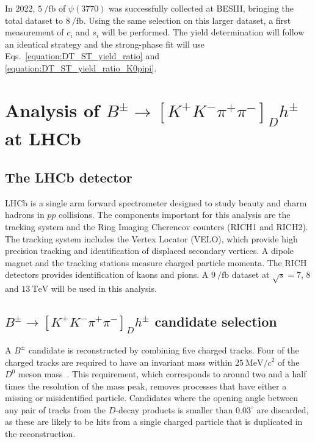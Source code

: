 \documentclass[12pt, a4paper, notitlepage, onecolumn]{article}
\begin{document}
In 2022, $\SI{5}{\per\femto\barn}$ of $\psi(3770)$ was successfully collected at BESIII, bringing the total dataset to $\SI{8}{\per\femto\barn}$. Using the same selection on this larger dataset, a first measurement of $c_i$ and $s_i$ will be performed. The yield determination will follow an identical strategy and the strong-phase fit will use Eqs.~\eqref{equation:DT_ST_yield_ratio} and \eqref{equation:DT_ST_yield_ratio_K0pipi}.

\section{Analysis of \texorpdfstring{$B^\pm\to[K^+K^-\pi^+\pi^-]_Dh^\pm$}{B2DhD2KKpipi} at LHCb}
\subsection{The LHCb detector}
\noindent LHCb \cite{cite_LHCb} is a single arm forward spectrometer designed to study beauty and charm hadrons in $pp$ collisions. The components important for this analysis are the tracking system and the Ring Imaging Cherencov counters (RICH1 and RICH2). The tracking system includes the Vertex Locator (VELO), which provide high precision tracking and identification of displaced secondary vertices. A dipole magnet and the tracking stations measure charged particle momenta. The RICH detectors provides identification of kaons and pions. A $\SI{9}{\per\femto\barn}$ dataset at $\sqrt{s} = 7$, $8$ and $\SI{13}{\tera\eV}$ will be used in this analysis.

\subsection{\texorpdfstring{$B^\pm\to[K^+K^-\pi^+\pi^-]_Dh^\pm$}{B2DhD2KKpipi} candidate selection}
\noindent A $B^\pm$ candidate is reconstructed by combining five charged tracks. Four of the charged tracks are required to have an invariant mass within $\SI{25}{\mega\eV/c^2}$ of the $D^0$ meson mass~\cite{PDG2022}. This requirement, which corresponds to around two and a half times the resolution of the mass peak, removes processes that have either a missing or misidentified particle. Candidates where the opening angle between any pair of tracks from the $D$-decay products is smaller than $0.03^\circ$ are discarded, as these are likely to be hits from a single charged particle that is duplicated in the reconstruction.
\end{document}
